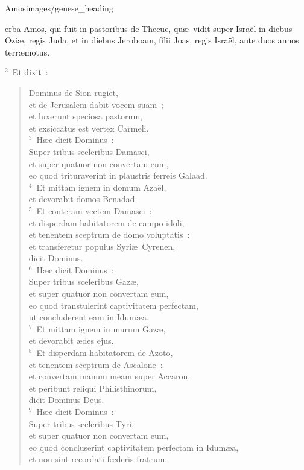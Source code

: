 {Amos}{images/genese_heading}


\bchapter
{}erba Amos, qui fuit in pastoribus de Thecue, qu\ae\ vidit super Isra\"el in diebus Ozi\ae , regis Juda, et in diebus Jeroboam, filii Joas, regis Isra\"el, ante duos annos terr\ae motus.


${}^{2}$~Et dixit~: \begin{verse}Dominus de Sion rugiet,\\ et de Jerusalem dabit vocem suam~;\\ et luxerunt speciosa pastorum,\\ et exsiccatus est vertex Carmeli.\\
${}^{3}$~H\ae c dicit Dominus~:\\ Super tribus sceleribus Damasci,\\ et super quatuor non convertam eum,\\ eo quod trituraverint in plaustris ferreis Galaad.\\
${}^{4}$~Et mittam ignem in domum Aza\"el,\\ et devorabit domos Benadad.\\
${}^{5}$~Et conteram vectem Damasci~:\\ et disperdam habitatorem de campo idoli,\\ et tenentem sceptrum de domo voluptatis~:\\ et transferetur populus Syri\ae\ Cyrenen,\\ dicit Dominus.\\
${}^{6}$~H\ae c dicit Dominus~:\\ Super tribus sceleribus Gaz\ae ,\\ et super quatuor non convertam eum,\\ eo quod transtulerint captivitatem perfectam,\\ ut concluderent eam in Idum\ae a.\\
${}^{7}$~Et mittam ignem in murum Gaz\ae ,\\ et devorabit \ae des ejus.\\
${}^{8}$~Et disperdam habitatorem de Azoto,\\ et tenentem sceptrum de Ascalone~:\\ et convertam manum meam super Accaron,\\ et peribunt reliqui Philisthinorum,\\ dicit Dominus Deus.\\
${}^{9}$~H\ae c dicit Dominus~:\\ Super tribus sceleribus Tyri,\\ et super quatuor non convertam eum,\\ eo quod concluserint captivitatem perfectam in Idum\ae a,\\ et non sint recordati fœderis fratrum.\\

\end{verse}
